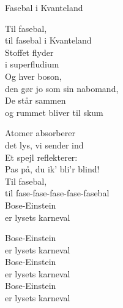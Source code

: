 \begin{song}{Fasebal i Kvanteland}
  \begin{SBChorus}
    Til fasebal,\\
    \hspace{1em}til fasebal i Kvanteland\\
    Stoffet flyder\\
    \hspace{1em}i superfludium\\
    Og hver boson,\\
    \hspace{1em}den gør jo som sin nabomand,\\
    De står sammen\\
    \hspace{1em}og rummet bliver til skum\\
  \end{SBChorus}

  \begin{SBSection*}
    Atomer absorberer\\
    \hspace{1em}det lys, vi sender ind\\
    Et spejl reflekterer:\\
    \hspace{1em}Pas på, du ik' bli'r blind!\\
    Til fasebal,\\
    \hspace{1em}til fase-fase-fase-fase-fasebal\\
    Bose-Einstein\\
    \hspace{1em}er lysets karneval
  \end{SBSection*}

  \begin{SBSection*}
    Bose-Einstein\\
    \hspace{1em}er lysets karneval\\
    Bose-Einstein\\
    \hspace{1em}er lysets karneval\\
    Bose-Einstein\\
    \hspace{1em}er lysets karneval
  \end{SBSection*}
\end{song}